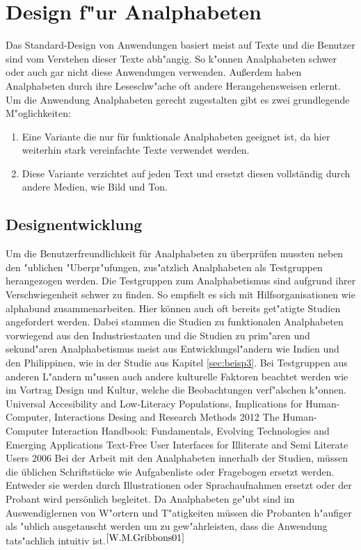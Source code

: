 \section{Design f"ur Analphabeten}
Das Standard-Design von Anwendungen basiert meist auf Texte und die Benutzer sind vom Verstehen dieser Texte abh"angig. So  k"onnen Analphabeten schwer oder auch gar nicht diese Anwendungen verwenden. Außerdem haben Analphabeten durch ihre Leseschw"ache oft andere Herangehensweisen erlernt.\\
Um die Anwendung Analphabeten gerecht zugestalten gibt es zwei grundlegende M"oglichkeiten:
\begin{enumerate}
	\item Eine Variante die nur für funktionale Analphabeten geeignet ist, da hier weiterhin stark vereinfachte Texte verwendet werden.
	\item Diese Variante verzichtet auf jeden Text und ersetzt diesen vollständig durch andere Medien, wie Bild und Ton.
\end{enumerate}

\subsection{Designentwicklung}\label{sec:designEval}
Um die Benutzerfreundlichkeit für Analphabeten zu überprüfen mussten neben den "ublichen "Uberpr"ufungen, zus"atzlich Analphabeten als Testgruppen herangezogen werden. Die Testgruppen zum Analphabetismus sind aufgrund ihrer Verschwiegenheit schwer zu finden. So empfielt es sich mit  Hilfsorganisationen wie \glqq alphabund\grqq{}  zusammenarbeiten. Hier können auch oft bereits get"atigte Studien angefordert werden. Dabei stammen die Studien zu funktionalen Analphabeten vorwiegend aus den Industriestaaten und die Studien zu prim"aren und sekund"aren Analphabetismus meist aus Entwicklungsl"andern wie Indien und den Philippinen,  wie in der Studie aus Kapitel \ref{sec:beisp3}. Bei Testgruppen aus anderen L"andern m"ussen auch andere kulturelle Faktoren beachtet werden wie im Vortrag \glqq Design und Kultur\grqq{}, welche die Beobachtungen verf"alschen k"onnen.  
					{Universal Accesibility and Low-Literacy Populations, Implications for Human-Computer, Interactions Desing and Research Methods}
					{2012}
					{The Human-Computer Interaction Handbook: Fundamentals, Evolving Technologies and Emerging Applications}
					{Text-Free User Interfaces for Illiterate and Semi Literate Users}
					{2006}{}
Bei der Arbeit mit den Analphabeten innerhalb der Studien, müssen die üblichen Schriftstücke wie Aufgabenliste oder Fragebogen ersetzt werden. Entweder sie werden durch Illustrationen oder Sprachaufnahmen ersetzt oder der Probant wird persönlich begleitet.
Da Analphabeten ge"ubt sind im Auswendiglernen von W"ortern und T"atigkeiten müssen die Probanten h"aufiger als "ublich ausgetauscht werden um zu gew"ahrleisten, dass die Anwendung tats"achlich intuitiv ist.$^{\ref{W.M.Gribbons01}}$\\
\newpage

